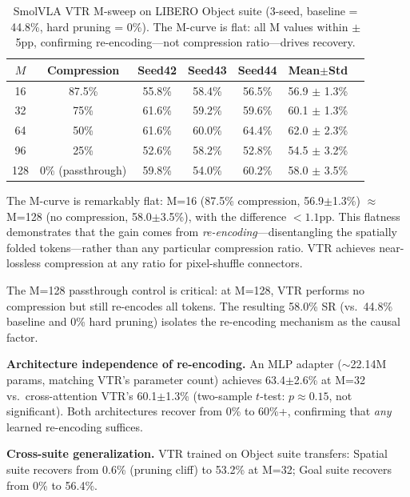 \documentclass[letterpaper]{article}
\begin{document}
\begin{table}[t]
\centering
\caption{SmolVLA VTR M-sweep on LIBERO Object suite (3-seed, baseline = 44.8\%, hard pruning = 0\%). The M-curve is flat: all M values within $\pm$5pp, confirming re-encoding---not compression ratio---drives recovery.}
\label{tab:vtr_msweep}
\small
\begin{tabular}{@{}ccccccc@{}}
\toprule
$M$ & \textbf{Compression} & \textbf{Seed42} & \textbf{Seed43} & \textbf{Seed44} & \textbf{Mean$\pm$Std} \\
\midrule
16  & 87.5\% & 55.8\% & 58.4\% & 56.5\% & 56.9 $\pm$ 1.3\% \\
32  & 75\%   & 61.6\% & 59.2\% & 59.6\% & 60.1 $\pm$ 1.3\% \\
64  & 50\%   & 61.6\% & 60.0\% & 64.4\% & 62.0 $\pm$ 2.3\% \\
96  & 25\%   & 52.6\% & 58.2\% & 52.8\% & 54.5 $\pm$ 3.2\% \\
128 & 0\% (passthrough) & 59.8\% & 54.0\% & 60.2\% & 58.0 $\pm$ 3.5\% \\
\bottomrule
\end{tabular}
\end{table}

The M-curve is remarkably flat: M=16 (87.5\% compression, 56.9$\pm$1.3\%) $\approx$ M=128 (no compression, 58.0$\pm$3.5\%), with the difference $< 1.1$pp. This flatness demonstrates that the gain comes from \emph{re-encoding}---disentangling the spatially folded tokens---rather than any particular compression ratio. VTR achieves near-lossless compression at any ratio for pixel-shuffle connectors.

The M=128 passthrough control is critical: at M=128, VTR performs no compression but still re-encodes all tokens. The resulting 58.0\% SR (vs.\ 44.8\% baseline and 0\% hard pruning) isolates the re-encoding mechanism as the causal factor.

\textbf{Architecture independence of re-encoding.} An MLP adapter ($\sim$22.14M params, matching VTR's parameter count) achieves 63.4$\pm$2.6\% at M=32 vs.\ cross-attention VTR's 60.1$\pm$1.3\% (two-sample $t$-test: $p \approx 0.15$, not significant). Both architectures recover from 0\% to 60\%+, confirming that \emph{any} learned re-encoding suffices.

\textbf{Cross-suite generalization.} VTR trained on Object suite transfers: Spatial suite recovers from 0.6\% (pruning cliff) to 53.2\% at M=32; Goal suite recovers from 0\% to 56.4\%.

\end{document}
